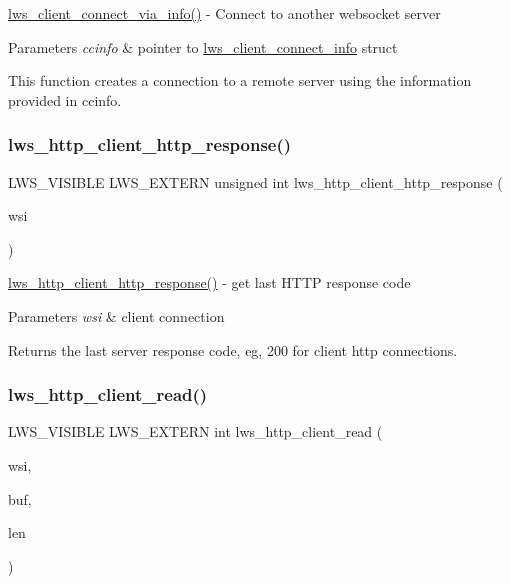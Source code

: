 \hyperlink{group__client_ga0c966136905f467816307cfba6deb5fd}{lws\+\_\+client\+\_\+connect\+\_\+via\+\_\+info()} -\/ Connect to another websocket server 
\begin{DoxyParams}{Parameters}
{\em ccinfo} & pointer to \hyperlink{structlws__client__connect__info}{lws\+\_\+client\+\_\+connect\+\_\+info} struct\\
\hline
\end{DoxyParams}
This function creates a connection to a remote server using the information provided in ccinfo. \mbox{\label{group__client_ga715efffc0c4e8fbf72a4293008eb2187}} 
\subsubsection{\texorpdfstring{lws\+\_\+http\+\_\+client\+\_\+http\+\_\+response()}{lws\_http\_client\_http\_response()}}
{\footnotesize\ttfamily L\+W\+S\+\_\+\+V\+I\+S\+I\+B\+LE L\+W\+S\+\_\+\+E\+X\+T\+E\+RN unsigned int lws\+\_\+http\+\_\+client\+\_\+http\+\_\+response (\begin{DoxyParamCaption}\item[{struct \hyperlink{structlws}{lws} $\ast$}]{wsi }\end{DoxyParamCaption})}

\hyperlink{group__client_ga715efffc0c4e8fbf72a4293008eb2187}{lws\+\_\+http\+\_\+client\+\_\+http\+\_\+response()} -\/ get last H\+T\+TP response code


\begin{DoxyParams}{Parameters}
{\em wsi} & client connection\\
\hline
\end{DoxyParams}
Returns the last server response code, eg, 200 for client http connections. \mbox{\label{group__client_ga4450c34200bf9dab3beb90ef23221870}} 
\subsubsection{\texorpdfstring{lws\+\_\+http\+\_\+client\+\_\+read()}{lws\_http\_client\_read()}}
{\footnotesize\ttfamily L\+W\+S\+\_\+\+V\+I\+S\+I\+B\+LE L\+W\+S\+\_\+\+E\+X\+T\+E\+RN int lws\+\_\+http\+\_\+client\+\_\+read (\begin{DoxyParamCaption}\item[{struct \hyperlink{structlws}{lws} $\ast$}]{wsi,  }\item[{char $\ast$$\ast$}]{buf,  }\item[{int $\ast$}]{len }\end{DoxyParamCaption})}

